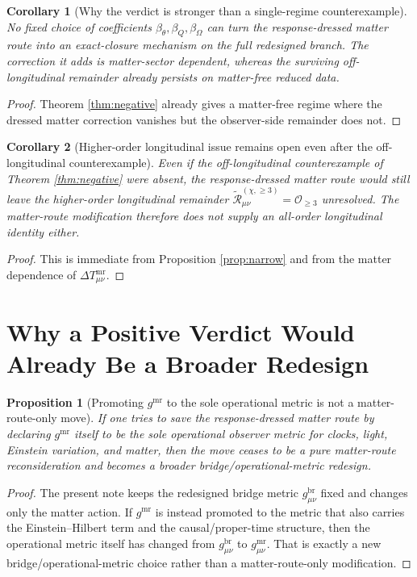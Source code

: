 \documentclass[11pt]{article}
\newcommand{\MatterMetric}{g^{\mathrm{mr}}}
\newcommand{\ReLong}{\widetilde{\mathcal R}_{\mu\nu}^{(\chi,\ge 3)}}
\newcommand{\DeltaTM}{\Delta T_{\mu\nu}^{\mathrm{mr}}}
\newtheorem{proposition}{Proposition}
\newtheorem{corollary}{Corollary}
\begin{document}
\begin{corollary}[Why the verdict is stronger than a single-regime counterexample]
\label{cor:stronger}
No fixed choice of coefficients \(\beta_\theta,\beta_Q,\beta_\Omega\) can turn the response-dressed matter route into an exact-closure mechanism on the full redesigned branch. The correction it adds is matter-sector dependent, whereas the surviving off-longitudinal remainder already persists on matter-free reduced data.
\end{corollary}

\begin{proof}
Theorem \ref{thm:negative} already gives a matter-free regime where the dressed matter correction vanishes but the observer-side remainder does not.
\end{proof}

\begin{corollary}[Higher-order longitudinal issue remains open even after the off-longitudinal counterexample]
\label{cor:long}
Even if the off-longitudinal counterexample of Theorem \ref{thm:negative} were absent, the response-dressed matter route would still leave the higher-order longitudinal remainder \(\ReLong=\mathcal O_{\ge 3}\) unresolved. The matter-route modification therefore does not supply an all-order longitudinal identity either.
\end{corollary}

\begin{proof}
This is immediate from Proposition \ref{prop:narrow} and from the matter dependence of \(\DeltaTM\).
\end{proof}

\section{Why a Positive Verdict Would Already Be a Broader Redesign}

\begin{proposition}[Promoting \(\MatterMetric\) to the sole operational metric is not a matter-route-only move]
\label{prop:broad}
If one tries to save the response-dressed matter route by declaring \(\MatterMetric\) itself to be the sole operational observer metric for clocks, light, Einstein variation, and matter, then the move ceases to be a pure matter-route reconsideration and becomes a broader bridge/operational-metric redesign.
\end{proposition}

\begin{proof}
The present note keeps the redesigned bridge metric \(g_{\mu\nu}^{\mathrm{br}}\) fixed and changes only the matter action. If \(\MatterMetric\) is instead promoted to the metric that also carries the Einstein--Hilbert term and the causal/proper-time structure, then the operational metric itself has changed from \(g_{\mu\nu}^{\mathrm{br}}\) to \(g_{\mu\nu}^{\mathrm{mr}}\). That is exactly a new bridge/operational-metric choice rather than a matter-route-only modification.
\end{proof}
\end{document}
